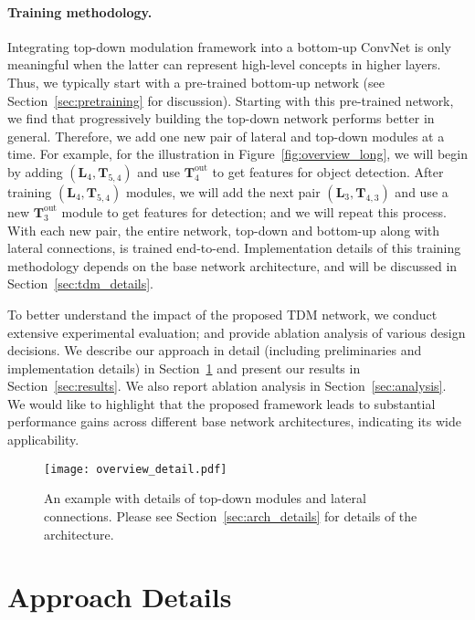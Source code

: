 \documentclass[10pt,twocolumn,letterpaper]{article}
\begin{document}
\vspace{-0.1in}
\paragraph{Training methodology.} Integrating top-down modulation framework into a bottom-up ConvNet is only meaningful when the latter can represent high-level concepts in higher layers. Thus, we typically start with a pre-trained bottom-up network (see Section~\ref{sec:pretraining} for discussion). Starting with this pre-trained network, we find that progressively building the top-down network performs better in general. Therefore, we add one new pair of lateral and top-down modules at a time. For example, for the illustration in Figure~\ref{fig:overview_long}, we will begin by adding $\left(\mathbf{L}_4, \mathbf{T}_{5,4}\right)$ and use $\mathbf{T}^\text{out}_4$ to get features for object detection. After training $\left(\mathbf{L}_4, \mathbf{T}_{5,4}\right)$ modules, we will add the next pair $\left(\mathbf{L}_3, \mathbf{T}_{4,3}\right)$ and use a new $\mathbf{T}^\text{out}_3$ module to get features for detection; and we will repeat this process. With each new pair, the entire network, top-down and bottom-up along with lateral connections, is trained end-to-end. Implementation details of this training methodology depends on the base network architecture, and will be discussed in Section~\ref{sec:tdm_details}.

To better understand the impact of the proposed TDM network, we conduct extensive experimental evaluation; and provide ablation analysis of various design decisions. We describe our approach in detail (including preliminaries and implementation details) in Section~\ref{sec:details} and present our results in Section~\ref{sec:results}. We also report ablation analysis in Section~\ref{sec:analysis}. We would like to highlight that the proposed framework leads to substantial performance gains across different base network architectures, indicating its wide applicability.

\begin{figure}[t]
    \centering
    \texttt{[image: overview\_detail.pdf]}
    \caption{An example with details of top-down modules and lateral connections. Please see Section~\ref{sec:arch_details} for details of the architecture.}
    \vspace{-0.1in}
    \label{fig:overview_details}
\end{figure}


\section{Approach Details}\label{sec:details}
\end{document}
